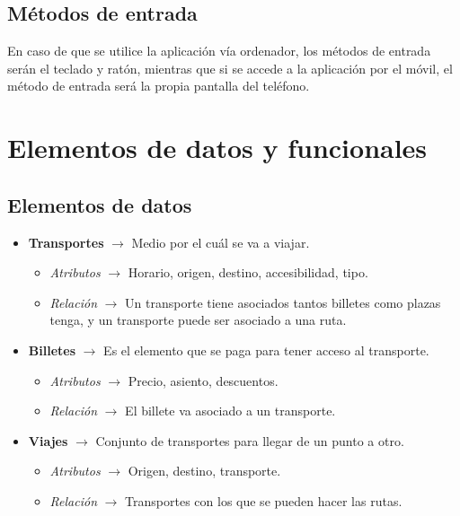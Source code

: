 \subsection{Métodos de entrada}
En caso de que se utilice la aplicación vía ordenador, los métodos de entrada serán el teclado y ratón, mientras que si se accede a la aplicación por el móvil, 
el método de entrada será la propia pantalla del teléfono.

\section{Elementos de datos y funcionales}
\subsection{Elementos de datos}
\begin{itemize}
    \item \textbf{Transportes} $\rightarrow$ Medio por el cuál se va a viajar.
    \begin{itemize}
        \item \textit{Atributos} $\rightarrow$ Horario, origen, destino, accesibilidad, tipo.
        \item \textit{Relación} $\rightarrow$ Un transporte tiene asociados tantos billetes como plazas tenga, y un transporte puede ser asociado a una ruta.
    \end{itemize}
    \item \textbf{Billetes} $\rightarrow$ Es el elemento que se paga para tener acceso al transporte.
    \begin{itemize}
        \item \textit{Atributos} $\rightarrow$ Precio, asiento, descuentos.
        \item \textit{Relación} $\rightarrow$ El billete va asociado a un transporte.
    \end{itemize}
    \item \textbf{Viajes} $\rightarrow$ Conjunto de transportes para llegar de un punto a otro.
    \begin{itemize}
        \item \textit{Atributos} $\rightarrow$ Origen, destino, transporte.
        \item \textit{Relación} $\rightarrow$ Transportes con los que se pueden hacer las rutas.
    \end{itemize}
\end{itemize} 

